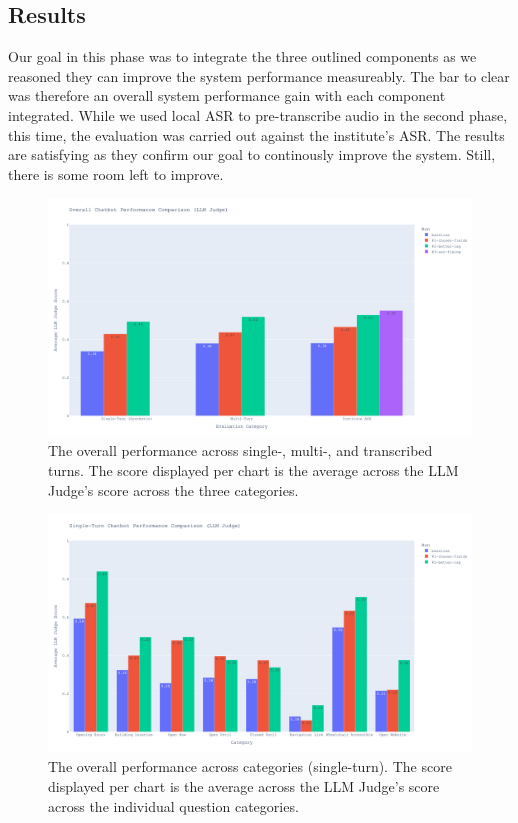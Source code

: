 \documentclass{article}
\begin{document}
\subsection{Results}

Our goal in this phase was to integrate the three outlined components as we reasoned they can improve the system performance measureably. The bar to clear was therefore an overall system performance gain with each component integrated. While we used local ASR to pre-transcribe audio in the second phase, this time, the evaluation was carried out against the institute's ASR. The results are satisfying as they confirm our goal to continously improve the system. Still, there is some room left to improve.

\begin{figure}[H]
    \centering
    \includegraphics[width=1\linewidth]{overall_performance_comparison.png}
    \caption{The overall performance across single-, multi-, and transcribed turns. The score displayed per chart is the average across the LLM Judge's score across the three categories.}
    \label{fig:overall_perf}
\end{figure}

\begin{figure}[H]
    \centering
    \includegraphics[width=1\linewidth]{single_turn_performance_comparison.png}
    \caption{The overall performance across categories (single-turn). The score displayed per chart is the average across the LLM Judge's score across the individual question categories.}
    \label{fig:single_turn_perf}
\end{figure}
\end{document}
